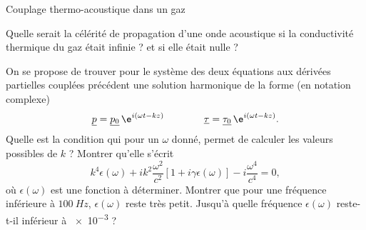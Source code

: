 \begin{exo}[PC]{Couplage thermo-acoustique dans un gaz}
\begin{quest}
\item Quelle serait la célérité de propagation d'une onde acoustique si la conductivité thermique du gaz était infinie ? et si elle était nulle ?
\item On se propose de trouver pour le système des deux équations aux dérivées partielles couplées précédent une solution harmonique de la forme (en notation complexe)
\begin{equation}
\underline{p}=\underline{p_0}\,\e^{i(\omega t-kz)}\qquad \qquad\underline{\tau}=\underline{\tau_0}\,\e^{i(\omega t-kz)}.
\end{equation}
Quelle est la condition qui pour un $\omega$ donné, permet de calculer les valeurs possibles de $k$ ? Montrer qu'elle s'écrit
$$k^4\epsilon(\omega)+ik^2\frac{\omega^2}{c^2}\left[1+i\gamma\epsilon(\omega)\right]-i\frac{\omega^4}{c^4}=0,$$
où $\epsilon(\omega)$ est une fonction à déterminer. Montrer que pour une fréquence inférieure à $\SI{100}{Hz}$, $\epsilon(\omega)$ reste très petit. Jusqu'à quelle fréquence $\epsilon(\omega)$ reste-t-il inférieur à \num{e-3} ?
\end{quest}
\end{exo}

